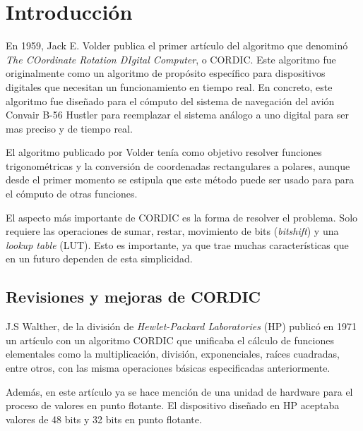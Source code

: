 
\chapter{Introducción}


En 1959, Jack E. Volder publica el primer artículo del algoritmo que denominó \textit{The COordinate Rotation DIgital Computer}, o CORDIC. Este algoritmo fue originalmente como un algoritmo de propósito específico para dispositivos digitales que necesitan un funcionamiento en tiempo real. En concreto, este algoritmo fue diseñado para el cómputo del sistema de navegación del avión Convair B-56 Hustler para reemplazar el sistema análogo a uno digital para ser mas preciso y de tiempo real. 

El algoritmo publicado por Volder tenía como objetivo resolver funciones trigonométricas y la conversión de coordenadas rectangulares a polares, aunque desde el primer momento se estipula que este método puede ser usado para para el cómputo de otras funciones.

El aspecto más importante de CORDIC es la forma de resolver el problema. Solo requiere las operaciones de sumar, restar, movimiento de bits (\textit{bitshift}) y una \textit{lookup table} (LUT). Esto es importante, ya que trae muchas características que en un futuro dependen de esta simplicidad.


\section{Revisiones y mejoras de CORDIC}

J.S Walther, de la división de \textit{Hewlet-Packard Laboratories} (HP) publicó en 1971 un artículo con un algoritmo CORDIC que unificaba el cálculo de funciones elementales como la multiplicación, división, exponenciales, raíces cuadradas, entre otros, con las misma operaciones básicas especificadas anteriormente.

Además, en este artículo ya se hace mención de una unidad de hardware para el proceso de valores en punto flotante. El dispositivo diseñado en HP aceptaba valores de 48 bits y 32 bits en punto flotante.

